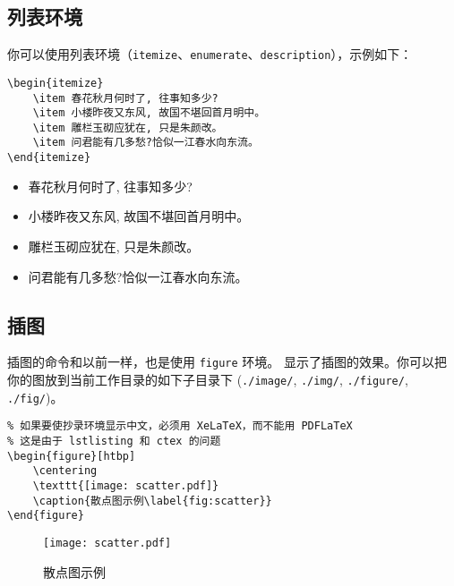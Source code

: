 \documentclass[lang=cn]{elegantpaper}
\begin{document}
\subsection{列表环境}
你可以使用列表环境（\lstinline{itemize}、\lstinline{enumerate}、\lstinline{description}），示例如下：\\[2ex]
\begin{minipage}[c]{0.51\linewidth}
\begin{lstlisting}
\begin{itemize}
	\item 春花秋月何时了, 往事知多少? 
	\item 小楼昨夜又东风, 故国不堪回首月明中。
	\item 雕栏玉砌应犹在, 只是朱颜改。
	\item 问君能有几多愁?恰似一江春水向东流。
\end{itemize}
\end{lstlisting}
\end{minipage}
\begin{minipage}[c]{0.48\linewidth}
\begin{itemize}
	\item 春花秋月何时了, 往事知多少? 
	\item 小楼昨夜又东风, 故国不堪回首月明中。
	\item 雕栏玉砌应犹在, 只是朱颜改。
	\item 问君能有几多愁?恰似一江春水向东流。
\end{itemize}
\end{minipage}




\subsection{插图}
插图的命令和以前一样，也是使用 \lstinline{figure} 环境。 显示了插图的效果。你可以把你的图放到当前工作目录的如下子目录下 (\lstinline{./image/}, \lstinline{./img/}, \lstinline{./figure/}, \lstinline{./fig/})。

\begin{lstlisting}
% 如果要使抄录环境显示中文，必须用 XeLaTeX，而不能用 PDFLaTeX
% 这是由于 lstlisting 和 ctex 的问题
\begin{figure}[htbp]
	\centering
	\texttt{[image: scatter.pdf]}
	\caption{散点图示例\label{fig:scatter}} 
\end{figure}
\end{lstlisting}

\begin{figure}[htbp]
	\centering
	\texttt{[image: scatter.pdf]}
	\caption{散点图示例\label{fig:scatter}}
\end{figure}
\end{document}

